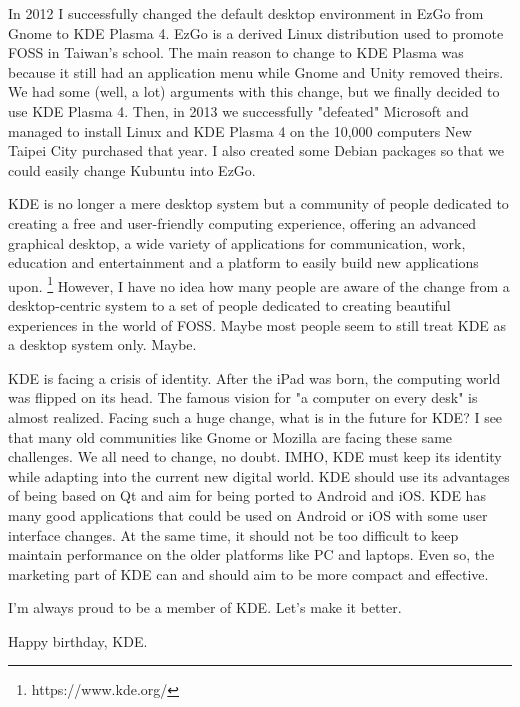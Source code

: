 In 2012 I successfully changed the default desktop environment in EzGo from Gnome to KDE
Plasma 4. EzGo is a derived Linux distribution used to promote
FOSS in Taiwan's school. The main reason to change to KDE Plasma was
because it still had an application menu while Gnome and Unity
removed theirs. We had some (well, a lot) arguments with this change,
but we finally decided to use KDE Plasma 4. Then, in 2013 we successfully
"defeated" Microsoft and managed to install Linux and KDE Plasma 4 on the 
10,000 computers New Taipei City purchased that year. 
I also created some Debian packages so that we could easily change Kubuntu into EzGo. 

KDE is no longer a mere desktop system but a community of people
dedicated to creating a free and user-friendly computing experience, offering an advanced
graphical desktop, a wide variety of applications for communication,
work, education and entertainment and a platform to easily build new
applications upon.
\footnote{https://www.kde.org/%
} However, I have no idea how many people are aware of the
change from a desktop-centric system to a set of people dedicated to
creating beautiful experiences in the world of FOSS. Maybe most people
seem to still treat KDE as a desktop system only. Maybe. 

KDE is facing a crisis of identity. After the iPad was born, the 
computing world was flipped on its head. The famous vision for 
"a computer on every desk" is almost realized. Facing
such a huge change, what is in the future for KDE?
I see that many old communities like Gnome or Mozilla are facing these
same challenges. We all need to change, no doubt. IMHO, KDE must
keep its identity while adapting into the current new digital
world. KDE should use its advantages of being based on Qt and aim for
being ported to Android and iOS. KDE has many good applications that
 could be used on Android or iOS with some user interface changes.
At the same time, it should not be too difficult to keep maintain performance
on the older platforms like PC and laptops. Even so, 
the marketing part of KDE can and should aim to be more compact and
effective.

I'm always proud to be a member of KDE. Let's make it better.

Happy birthday, KDE.
